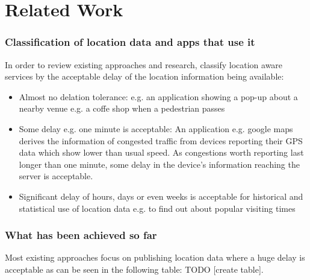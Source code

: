 \chapter{Related Work}\label{chapter:related-work}

\subsection{Classification of location data and apps that use it}
In order to review existing approaches and research, classify location aware services by the acceptable delay of the location information being available:
\begin{itemize}
  \item Almost no delation tolerance: e.g. an application showing a pop-up about a nearby venue e.g. a coffe shop when a pedestrian passes
  \item Some delay e.g. one minute is acceptable: An application e.g. google maps derives the information of congested traffic from devices reporting their GPS data which show lower than usual speed. As congestions worth reporting last longer than one minute, some delay in the device's information reaching the server is acceptable.
  \item Significant delay of hours, days or even weeks is acceptable for historical and statistical use of location data e.g. to find out about popular visiting times
\end{itemize}

\subsection{What has been achieved so far}

Most existing approaches focus on publishing location data where a huge delay is acceptable as can be seen in the following table: TODO [create table].

